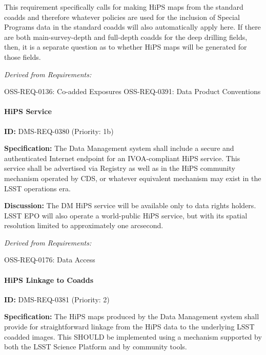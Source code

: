\documentclass[SE,toc,lsstdraft]{lsstdoc}
\begin{document}
This requirement specifically calls for making HiPS maps from the standard coadds and therefore whatever policies are used for the inclusion of Special Programs data in the standard coadds will also automatically apply here.  If there are both main-survey-depth and full-depth coadds for the deep drilling fields, then, it is a separate question as to whether HiPS maps will be generated for those fields.

\emph{Derived from Requirements:}

OSS-REQ-0136:
Co-added Exposures \newline
OSS-REQ-0391:
Data Product Conventions \newline

\paragraph{HiPS Service}\hfill  %

\label{DMS-REQ-0380}
\textbf{ID:} DMS-REQ-0380 (Priority: 1b)

\textbf{Specification:}
The Data Management system shall include a secure and authenticated Internet endpoint for an IVOA-compliant HiPS service.  This service shall be advertised via Registry as well as in the HiPS community mechanism operated by CDS, or whatever equivalent mechanism may exist in the LSST operations era.

\textbf{Discussion:}
The DM HiPS service will be available only to data rights holders.  LSST EPO will also operate a world-public HiPS service, but with its spatial resolution limited to approximately one arcsecond.

\emph{Derived from Requirements:}

OSS-REQ-0176:
Data Access \newline

\paragraph{HiPS Linkage to Coadds}\hfill  %

\label{DMS-REQ-0381}
\textbf{ID:} DMS-REQ-0381 (Priority: 2)

\textbf{Specification:}
The HiPS maps produced by the Data Management system shall provide for straightforward linkage from the HiPS data to the underlying LSST coadded images.  This SHOULD be implemented using a mechanism supported by both the LSST Science Platform and by community tools.
\end{document}
